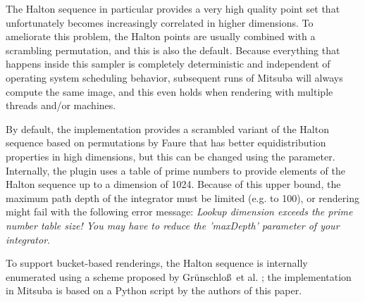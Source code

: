 The Halton sequence in particular provides a very high quality point set that unfortunately
becomes increasingly correlated in higher dimensions. To ameliorate this problem, the Halton
points are usually combined with a scrambling permutation, and this is also the default.
Because everything that happens inside this sampler is completely deterministic and
independent of operating system scheduling behavior, subsequent runs of Mitsuba will always
compute the same image, and this even holds when rendering with multiple threads
and/or machines.

By default, the implementation provides a scrambled variant of the Halton sequence based
on permutations by Faure \cite{Faure1992Good} that has better equidistribution properties
in high dimensions, but this can be changed using the  parameter.
Internally, the plugin uses a table of prime numbers to provide elements
of the Halton sequence up to a dimension of 1024. Because of this upper bound,
the maximum path depth of the integrator must be limited (e.g. to 100), or
rendering might fail with the following error message: \emph{Lookup dimension
exceeds the prime number table size! You may have to reduce the 'maxDepth'
parameter of your integrator}.

To support bucket-based renderings, the Halton sequence is internally enumerated
using a scheme proposed by Gr\"unschlo\ss\ et al. \cite{Grunschloss2010Enumerating};
the implementation in Mitsuba is based on a Python script by the authors of
this paper.

